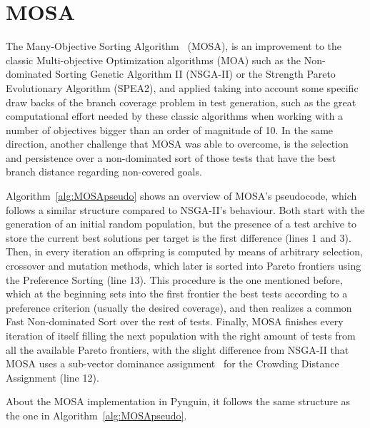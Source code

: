 \documentclass[%
  chapterprefix=false,%
  open=right,%
  twoside=true,%
  paper=a4,%
  logofile={Figures/logo.png},%
  thesistype=master,%
  UKenglish,%
]{se2thesis}
\begin{document}
\section{MOSA}

The Many-Objective Sorting Algorithm~\cite{DBLP:conf/icst/PanichellaKT15} (MOSA), is an improvement to the classic Multi-objective Optimization algorithms (MOA) such as the Non-dominated Sorting Genetic Algorithm II (NSGA-II) or the Strength Pareto Evolutionary Algorithm (SPEA2), and applied taking into account some specific draw backs of the branch coverage problem in test generation, such as the great computational effort needed by these classic algorithms when working with a number of objectives bigger than an order of magnitude of 10.
In the same direction, another challenge that MOSA was able to overcome, is the selection and persistence over a non-dominated sort of those tests that have the best branch distance regarding non-covered goals.

Algorithm~\ref{alg:MOSApseudo} shows an overview of MOSA's pseudocode, which follows a similar structure compared to NSGA-II's behaviour.
Both start with the generation of an initial random population, but the presence of a test archive to store the current best solutions per target is the first difference (lines 1 and 3).
Then, in every iteration an offspring is computed by means of arbitrary selection, crossover and mutation methods, which later is sorted into Pareto frontiers using the Preference Sorting (line 13).
This procedure is the one mentioned before, which at the beginning sets into the first frontier the best tests according to a preference criterion (usually the desired coverage), and then realizes a common Fast Non-dominated Sort over the rest of tests.
Finally, MOSA finishes every iteration of itself filling the next population with the right amount of tests from all the available Pareto frontiers, with the slight difference from NSGA-II that MOSA uses a sub-vector dominance assignment~\cite{DBLP:conf/issta/KifetewPLOT13} for the Crowding Distance Assignment (line 12).

About the MOSA implementation in Pynguin, it follows the same structure as the one in Algorithm~\ref{alg:MOSApseudo}.


\algrenewcommand{}
\algrenewcommand{}
\end{document}
